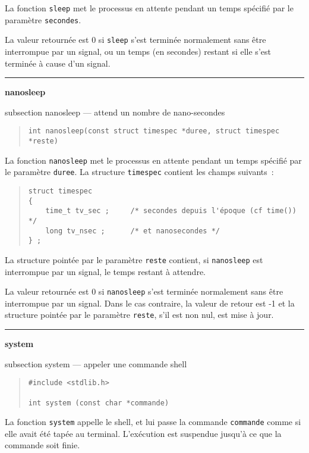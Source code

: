 \documentclass [twoside] {report}
\newcommand {\primitive} [1]
    {
	{\large \bf #1}
	\addcontentsline {toc} {subsection} {#1}
    }
\newcommand {\separation}
    {
	\vspace {7mm}
	\nopagebreak
	\hrule
    }
\begin{document}
La fonction {\tt sleep} met le processus en attente pendant un temps
spécifié par le paramètre {\tt secondes}.

La valeur retournée est 0 si {\tt sleep} s'est terminée normalement sans
être interrompue par un signal, ou un temps (en secondes) restant
si elle s'est terminée à cause d'un signal.


\separation 
\primitive {nanosleep} --- attend un nombre de nano-secondes

\begin {quote}
\begin {verbatim}
int nanosleep(const struct timespec *duree, struct timespec *reste)
\end{verbatim}
\end {quote}

La fonction {\tt nanosleep} met le processus en attente pendant un temps
spécifié par le paramètre {\tt duree}. La structure \texttt {timespec}
contient les champs suivants~:
\begin {quote}
    \small
\begin {verbatim}
struct timespec
{
    time_t tv_sec ;     /* secondes depuis l'époque (cf time()) */
    long tv_nsec ;      /* et nanosecondes */
} ;
\end{verbatim}
\end {quote}

La structure pointée par le paramètre \texttt {reste} contient, si
\texttt {nanosleep} est interrompue par un signal, le temps restant
à attendre.

La valeur retournée est 0 si {\tt nanosleep} s'est terminée normalement
sans être interrompue par un signal. Dans le cas contraire, la valeur de
retour est -1 et la structure pointée par le paramètre \texttt {reste},
s'il est non nul, est mise à jour.


\separation 
\primitive {system} --- appeler une commande shell

\begin {quote}
\begin {verbatim}
#include <stdlib.h>

int system (const char *commande)
\end{verbatim}
\end {quote}

La fonction {\tt system} appelle le shell, et lui passe la
commande {\tt commande} comme si elle avait été tapée au
terminal. L'exécution est suspendue jusqu'à ce que la
commande soit finie.
\end{document}
